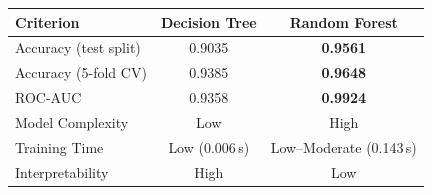 \documentclass[12pt,a4paper]{article}
\newenvironment{fitwidth}
  {\begin{lrbox}{\fitbox}}
  {\end{lrbox}\ifdim\wd\fitbox>\linewidth\resizebox{\linewidth}{!}{\usebox{\fitbox}}\else\usebox{\fitbox}\fi}
\DeclareRobustCommand{\_}{\textunderscore\allowbreak}
\begin{document}
\vspace{0.3cm}
\begin{center}
\begin{minipage}{\linewidth}\centering
\begin{fitwidth}
\begin{tabular}{lcc}
\toprule
Criterion & Decision Tree & Random Forest \\
\midrule
Accuracy (test split) & 0.9035 & \textbf{0.9561} \\
Accuracy (5-fold CV)   & 0.9385 & \textbf{0.9648} \\
ROC-AUC                & 0.9358 & \textbf{0.9924} \\
Model Complexity       & Low & High \\
Training Time          & Low (0.006\,s) & Low--Moderate (0.143\,s) \\
Interpretability       & High & Low \\
\bottomrule
\end{tabular}
\end{fitwidth}
\end{minipage}
\end{center}
\end{document}
